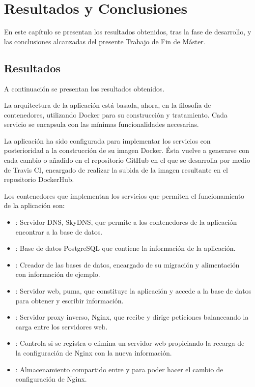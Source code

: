\chapter{Resultados y Conclusiones}
\label{cha:results}

En este capítulo se presentan los resultados obtenidos, tras la fase de desarrollo, y las conclusiones alcanzadas del presente Trabajo de Fin de Máster.

\section{Resultados}

A continuación se presentan los resultados obtenidos.

La arquitectura de la aplicación está basada, ahora, en la filosofía de contenedores, utilizando Docker para su construcción y tratamiento. Cada servicio se encapsula con las mínimas funcionalidades necesarias.

La aplicación ha sido configurada para implementar los servicios con posterioridad a la construcción de su imagen Docker. Ésta vuelve a generarse con cada cambio o añadido en el repositorio GitHub en el que se desarrolla por medio de Travis CI, encargado de realizar la subida de la imagen resultante en el repositorio DockerHub.

Los contenedores que implementan los servicios que permiten el funcionamiento de la aplicación son:
\begin{itemize}
\item {}: Servidor DNS, SkyDNS, que permite a los contenedores de la aplicación encontrar a la base de datos.
\item {}: Base de datos PostgreSQL que contiene la información de la aplicación.
\item {}: Creador de las bases de datos, encargado de su migración y alimentación con información de ejemplo.
\item {}: Servidor web, puma, que constituye la aplicación y accede a la base de datos para obtener y escribir información.
\item {}: Servidor proxy inverso, Nginx, que recibe y dirige peticiones balanceando la carga entre los servidores web.
\item {}: Controla si se registra o elimina un servidor web propiciando la recarga de la configuración de Nginx con la nueva información.
\item {}: Almacenamiento compartido entre  y  para poder hacer el cambio de configuración de Nginx.
\end{itemize}

